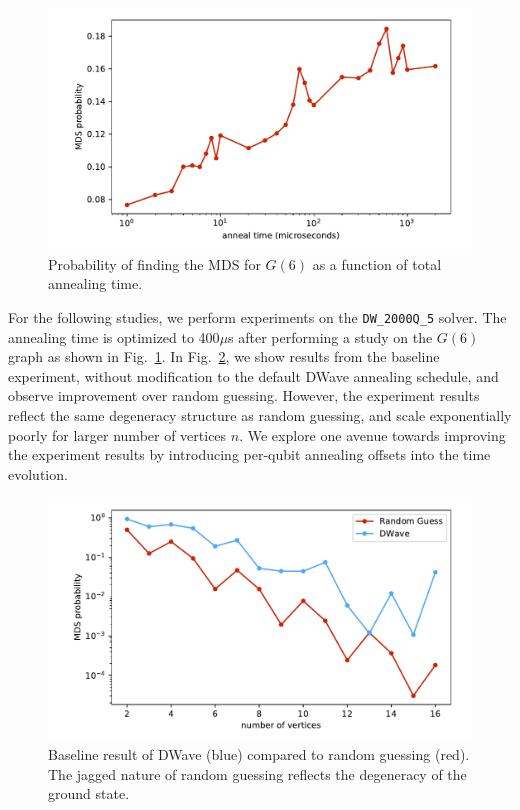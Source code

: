 \documentclass[prd,twocolumn,tightenlines,preprintnumbers,showpacs,superscriptaddress,notitlepage,nofootinbib,eqsecnum,floatfix,longbibliography]{revtex4}
\begin{document}
\begin{figure}[b]
    \centering
    \includegraphics[width=\columnwidth]{./figures/anneal_time_scaling.pdf}
    \caption{Probability of finding the MDS for $G(6)$ as a function of total annealing time.}
    \label{fig:at_scale}
\end{figure}

For the following studies, we perform experiments on the \texttt{DW\_2000Q\_5} solver.
The annealing time is optimized to 400$\mu$s after performing a study on the $G(6)$ graph as shown in Fig.~\ref{fig:at_scale}.
In Fig.~\ref{fig:baseline}, we show results from the baseline experiment, without modification to the default DWave annealing schedule, and observe improvement over random guessing.
However, the experiment results reflect the same degeneracy structure as random guessing, and scale exponentially poorly for larger number of vertices $n$.
We explore one avenue towards improving the experiment results by introducing per-qubit annealing offsets into the time evolution.

\begin{figure}
    \centering
    \includegraphics[width=\columnwidth]{./figures/scaling_baseline.pdf}
    \caption{Baseline result of DWave (blue) compared to random guessing (red).
The jagged nature of random guessing reflects the degeneracy of the ground state.}
    \label{fig:baseline}
\end{figure}
\end{document}
